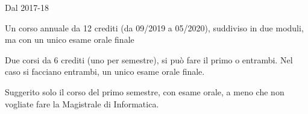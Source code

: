 \begin{frame}{Dal 2017-18}

\vspace{-9pt}
\begin{myboxtitle}
\BI
\item Un corso \alert{annuale} da 12 crediti (da 09/2019 a 05/2020), suddiviso in due moduli, ma con un unico esame orale finale
\EI
\end{myboxtitle}

\begin{myboxtitle}
\BI
\item Due corsi da 6 crediti (uno per semestre), si può fare il primo o entrambi. Nel caso si facciano entrambi, un unico esame orale finale.
\EI
\end{myboxtitle}

\begin{myboxtitle}
\BI
\item Suggerito solo il corso del primo semestre, con esame orale, a meno che non vogliate fare la Magistrale di Informatica.
\EI
\end{myboxtitle}
  
\end{frame}


